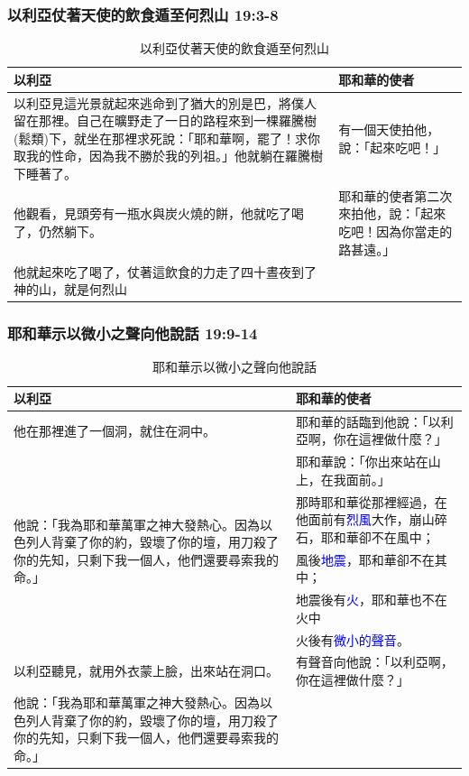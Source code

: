 \subsubsection{以利亞仗著天使的飲食遁至何烈山 19:3-8}
\begin{table}[H]
\centering 
{}
\begin{tabular}{p{}|p{5.5cm}}\hline\hline
以利亞&耶和華的使者\\\hline
以利亞見這光景就起來逃命到了猶大的別是巴，將僕人留在那裡。自己在曠野走了一日的路程來到一棵羅騰樹(鬆類)下，就坐在那裡求死說：「耶和華啊，罷了！求你取我的性命，因為我不勝於我的列祖。」他就躺在羅騰樹下睡著了。
&有一個天使拍他，說：「起來吃吧！」 \\\hline
他觀看，見頭旁有一瓶水與炭火燒的餅，他就吃了喝了，仍然躺下。&耶和華的使者第二次來拍他，說：「起來吃吧！因為你當走的路甚遠。」\\\hline
他就起來吃了喝了，仗著這飲食的力走了四十晝夜到了神的山，就是何烈山&\\\hline
\end{tabular}
\caption{以利亞仗著天使的飲食遁至何烈山}
\end{table} 


\subsubsection{耶和華示以微小之聲向他說話 19:9-14}
\begin{table}[H]
\centering 
{}
\begin{tabular}{p{7.75cm}|p{8.5cm}}\hline\hline
以利亞&耶和華的使者\\\hline
他在那裡進了一個洞，就住在洞中。
&耶和華的話臨到他說：「以利亞啊，你在這裡做什麼？」 \\\hline
\multirow{5}{7.8cm}{他說：「我為耶和華萬軍之神大發熱心。因為以色列人背棄了你的約，毀壞了你的壇，用刀殺了你的先知，只剩下我一個人，他們還要尋索我的命。」}&耶和華說：「你出來站在山上，在我面前。」\\\cline{2-2}
&那時耶和華從那裡經過，在他面前有\textcolor{blue}{烈風}大作，崩山碎石，耶和華卻不在風中；\\\cline{2-2}
&風後\textcolor{blue}{地震}，耶和華卻不在其中；\\\cline{2-2}
&地震後有\textcolor{blue}{火}，耶和華也不在火中\\\cline{2-2}
&火後有\textcolor{blue}{微小的聲音}。\\\hline
以利亞聽見，就用外衣蒙上臉，出來站在洞口。&有聲音向他說：「以利亞啊，你在這裡做什麼？」\\\hline
他說：「我為耶和華萬軍之神大發熱心。因為以色列人背棄了你的約，毀壞了你的壇，用刀殺了你的先知，只剩下我一個人，他們還要尋索我的命。」&\\\hline
\end{tabular}
\caption{耶和華示以微小之聲向他說話}
\end{table} 


